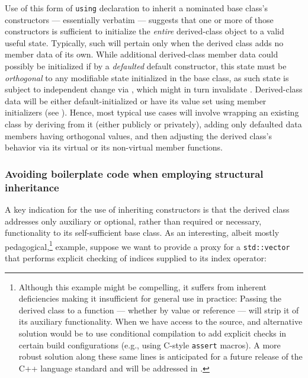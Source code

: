 Use of this form of \lstinline!using! declaration to inherit a nominated
base class's constructors --- essentially verbatim --- suggests that one
or more of those constructors is sufficient to initialize the
\emph{entire} derived-class object to a valid useful state. Typically,
such will pertain only when the derived class adds no member data of its
own. While additional derived-class member data could possibly
be initialized if by a \emph{defaulted} default constructor, this state must be \emph{orthogonal} to
any modifiable state initialized in the base class, as such state is
subject to independent change via , which might in turn
invalidate . Derived-class data will be either default-initialized or have its value set using member
initializers (see ).  
Hence, most typical use cases will involve wrapping an
existing class by deriving from it (either publicly or privately),
adding only defaulted data members having orthogonal values, and then
adjusting the derived class's behavior via  its virtual
or  its non-virtual member functions.

\subsubsection[Avoiding boilerplate code when employing structural inheritance]{Avoiding boilerplate code when employing structural inheritance}\label{avoiding-boilerplate-code-code-when-employing-structural-inheritance}

A key indication for the use of inheriting constructors is that the
derived class addresses only auxiliary or optional, rather than required
or necessary, functionality to its self-sufficient base class. As an
interesting, albeit mostly pedagogical,{\cprotect\footnote{Although this example might be compelling, it suffers from inherent deficiencies making it insufficient for general use in practice: Passing the derived class to a function --- whether by value or reference --- will
strip it of its auxiliary functionality. When we have access to the source, and alternative solution would be to use conditional compilation to add explicit checks in certain build configurations (e.g., using C-style \lstinline!assert! macros). A more robust solution along these same lines is anticipated for a future release of the C++ language standard and will be addressed in \cite{lakos23}.}} example, suppose we
want to provide a proxy for a \lstinline!std::vector! that performs
explicit checking of indices supplied to its index operator:

